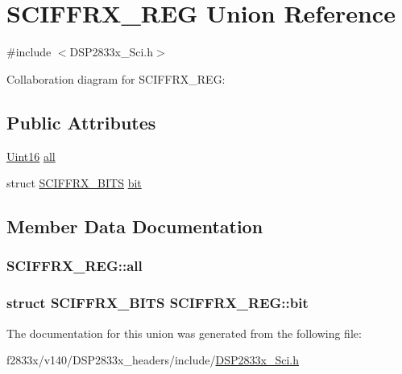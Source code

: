 \hypertarget{union_s_c_i_f_f_r_x___r_e_g}{}\section{S\+C\+I\+F\+F\+R\+X\+\_\+\+R\+E\+G Union Reference}
\label{union_s_c_i_f_f_r_x___r_e_g}


{\ttfamily \#include $<$D\+S\+P2833x\+\_\+\+Sci.\+h$>$}



Collaboration diagram for S\+C\+I\+F\+F\+R\+X\+\_\+\+R\+E\+G\+:
\subsection*{Public Attributes}
\begin{DoxyCompactItemize}
\item 
\hyperlink{_d_s_p2833x___device_8h_a59a9f6be4562c327cbfb4f7e8e18f08b}{Uint16} \hyperlink{union_s_c_i_f_f_r_x___r_e_g_adf2dd00b328fea5e4cf785fc452edcbf}{all}
\item 
struct \hyperlink{struct_s_c_i_f_f_r_x___b_i_t_s}{S\+C\+I\+F\+F\+R\+X\+\_\+\+B\+I\+T\+S} \hyperlink{union_s_c_i_f_f_r_x___r_e_g_a1ad0fa52694365601b2334ddad6d1b2e}{bit}
\end{DoxyCompactItemize}


\subsection{Member Data Documentation}
\hypertarget{union_s_c_i_f_f_r_x___r_e_g_adf2dd00b328fea5e4cf785fc452edcbf}{}
\subsubsection[{all}]{ S\+C\+I\+F\+F\+R\+X\+\_\+\+R\+E\+G\+::all}\label{union_s_c_i_f_f_r_x___r_e_g_adf2dd00b328fea5e4cf785fc452edcbf}
\hypertarget{union_s_c_i_f_f_r_x___r_e_g_a1ad0fa52694365601b2334ddad6d1b2e}{}
\subsubsection[{bit}]{\setlength{\rightskip}{0pt plus 5cm}struct {\bf S\+C\+I\+F\+F\+R\+X\+\_\+\+B\+I\+T\+S} S\+C\+I\+F\+F\+R\+X\+\_\+\+R\+E\+G\+::bit}\label{union_s_c_i_f_f_r_x___r_e_g_a1ad0fa52694365601b2334ddad6d1b2e}


The documentation for this union was generated from the following file\+:\begin{DoxyCompactItemize}
\item 
f2833x/v140/\+D\+S\+P2833x\+\_\+headers/include/\hyperlink{_d_s_p2833x___sci_8h}{D\+S\+P2833x\+\_\+\+Sci.\+h}\end{DoxyCompactItemize}
